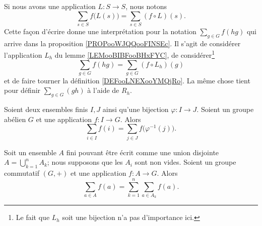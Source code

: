 Si nous avons une application \( L\colon S\to S\), nous notons
\begin{equation}
	\sum_{s\in S}f\big( L(s) \big)=\sum_{s\in S}(f\circ L)(s).
\end{equation}
Cette façon d'écrire donne une interprétation pour la notation \( \sum_{g\in G}f(hg)\) qui arrive dans la proposition \ref{PROPooWJQQooFINSEc}. Il s'agit de considérer l'application \( L_h\) du lemme \ref{LEMooBIBFooBHxFYC}, de considérer\footnote{Le fait que \( L_h\) soit une bijection n'a pas d'importance ici.}
\begin{equation}        \label{EQooQQBEooFDOBVG}
	\sum_{g\in G}f(hg)=\sum_{g\in G}(f\circ L_h)(g)
\end{equation}
et de faire tourner la définition \ref{DEFooLNEXooYMQjRo}. La même chose tient pour définir \( \sum_{g\in G}(gh)\) à l'aide de \( R_h\).


\begin{lemma}		\label{LEMooGAMAooOAFhrc}
	Soient deux ensembles finis \( I,J\) ainsi qu'une bijection \(\varphi \colon I\to J  \). Soient un groupe abélien \( G\) et une application \(f \colon I\to G  \). Alors
	\begin{equation}
		\sum_{i\in I}f(i)=\sum_{j\in J}f\big( \varphi^{-1}(j) \big).
	\end{equation}
\end{lemma}

\begin{lemma}		\label{LEMooNDBYooAGEkmw}
	Soit un ensemble \( A\) fini pouvant être écrit comme une union disjointe \( A=\bigcup_{k=1}^nA_k\); nous supposons que les \( A_i\) sont non vides. Soient un groupe commutatif \( (G,+)\) et une application \( f\colon A\to G\). Alors
	\begin{equation}
		\sum_{a\in A}f(a)=\sum_{k=1}^n\sum_{a\in A_k}f(a).
	\end{equation}
\end{lemma}


